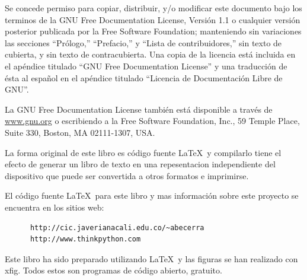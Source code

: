 Se concede permiso para copiar, distribuir, y/o modificar este documento bajo
los terminos de la GNU Free Documentation License, Versión 1.1 o cualquier
versión posterior publicada por la Free Software Foundation; manteniendo 
sin variaciones las secciones ``Prólogo,'' ``Prefacio,'' y ``Lista de contribuidores,''
sin texto de cubierta, y sin texto de contracubierta. Una copia de la licencia
está incluida en el apéndice titulado ``GNU Free Documentation License'' y una 
traducción de ésta al español en el apéndice titulado ``Licencia de Documentación Libre de GNU''.

La GNU Free Documentation License también está disponible a través de \url{www.gnu.org}
o escribiendo a la Free Software Foundation, Inc., 59 Temple Place,
Suite 330, Boston, MA 02111-1307, USA.

La forma original de este libro es código fuente \LaTeX\  y compilarlo
tiene el efecto de generar un libro de texto en una 
repesentacion independiente del dispositivo que puede ser convertida a otros 
formatos e imprimirse.

El código  fuente \LaTeX\  para este libro y mas información sobre este proyecto
se encuentra en los sitios web:

\begin{verbatim}
      http://cic.javerianacali.edu.co/~abecerra
      http://www.thinkpython.com
\end{verbatim}

Este libro ha sido preparado utilizando \LaTeX\ y las figuras
se han realizado con xfig.  Todos estos son programas de código
abierto, gratuito.

\vspace{0.25in}
\newpage
\thispagestyle{empty}

